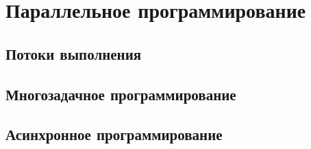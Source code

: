 \chapter{Параллельное программирование}

\section{Потоки выполнения}

\section{Многозадачное программирование}

\section{Асинхронное программирование}

